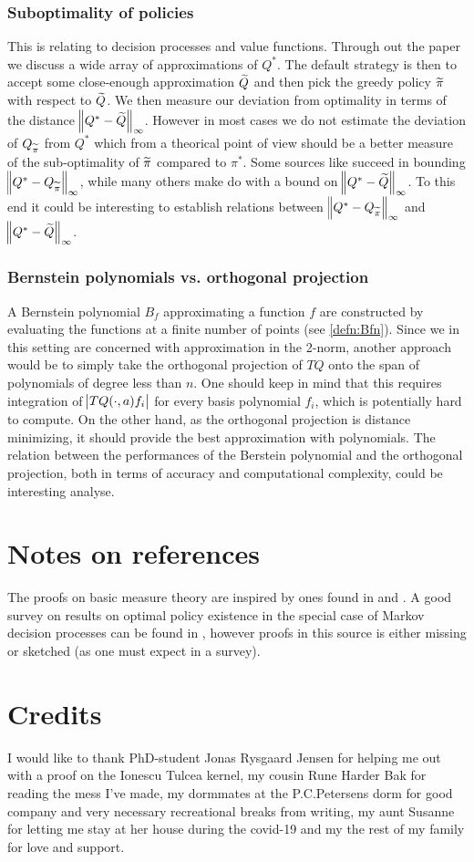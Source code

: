 \subsubsection{Suboptimality of policies}
This is relating to decision processes and value functions.
Through out the paper we discuss a wide array of
approximations of $Q^*$.
The default strategy is then to accept some close-enough approximation $\widetilde{Q}$
and then pick the greedy policy $\widetilde{\pi}$ with respect to $\widetilde{Q}$.
We then measure our deviation from optimality in terms of the distance
$\norm{Q^* - \widetilde{Q}}_\infty$.
However in most cases we do not estimate the deviation of
$Q_{\widetilde{\pi}}$ from $Q^*$ which from a theorical point of view should be
a better measure of the sub-optimality of $\widetilde{\pi}$ compared to $\pi^*$.
Some sources like  succeed in bounding
$\norm{Q^* - Q_{\widetilde{\pi}}}_\infty$,
while many others make do with a bound on $\norm{Q^* - \widetilde{Q}}_\infty$.
To this end it could be interesting to establish relations
between $\norm{Q^* - Q_{\widetilde{\pi}}}_\infty$ and $\norm{Q^* - \widetilde{Q}}_\infty$.

\subsubsection{Bernstein polynomials vs. orthogonal projection}
A Bernstein polynomial $B_f$ approximating a function $f$
are constructed by evaluating the
functions at a finite number of points (see \cref{defn:Bfn}).
Since we in this setting are concerned with approximation in the 2-norm,
another approach would be to simply take the orthogonal projection of
$TQ$ onto the span of polynomials of degree less than $n$.
One should keep in mind that this requires integration of
$\abs{TQ(\cdot, a) f_i}$ for every basis polynomial $f_i$,
which is potentially hard to compute.
On the other hand, as the orthogonal projection is distance minimizing,
it should provide the best approximation with polynomials.
The relation between the performances of the Berstein polynomial
and the orthogonal projection, both in terms of accuracy and 
computational complexity, could be interesting analyse.

\section{Notes on references}
The proofs on basic measure theory are inspired by ones found in
 and .
A good survey on results on optimal policy existence in the special case
of Markov decision processes can be found in ,
however proofs in this source is either missing or sketched
(as one must expect in a survey).

\section{Credits}
I would like to thank PhD-student Jonas Rysgaard Jensen for helping me
out with a proof on the Ionescu Tulcea kernel,
my cousin Rune Harder Bak for reading the mess I've made,
my dormmates at the P.C.Petersens dorm for good company and very necessary
recreational breaks from writing,
my aunt Susanne for letting me stay at her house during the covid-19 and
my the rest of my family for love and support.

